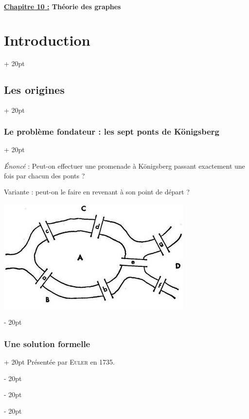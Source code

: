 \documentclass[a4paper, 12pt, twoside]{article}
\renewcommand{\emph}{\textcolor{ff4500}}
\newcommand{\ind}[1][20pt]{\advance\leftskip + #1}
\newcommand{\deind}[1][20pt]{\advance\leftskip - #1}
\newenvironment{indt}[2][20pt]{#2 \par \ind[#1]}{\par \deind} %
\newcommand{\thetitle}[2]{\begin{center}\textbf{{\LARGE \underline{\emph{#1} :}} {\Large #2}}\end{center}}
\begin{document}
    
    
    \thetitle{Chapitre 10}{Théorie des graphes}
    
    \tableofcontents
    \newpage
    
    
    \begin{indt}{\section{Introduction}}
        
        \begin{indt}{\subsection{Les origines}}
            \begin{indt}{\subsubsection{Le problème fondateur : les sept ponts de Königsberg}}
                \label{1.1.1}

                \textit{\'Enoncé} : Peut-on effectuer une promenade à Königsberg passant exactement une fois par chacun des ponts ?

                Variante : peut-on le faire en revenant à son point de départ ?

                \begin{center}
                    \includegraphics[scale=.5]{pics/pic_1.jpg}
                \end{center}
            \end{indt}

            \vspace{12pt}
            
            \begin{indt}{\subsubsection{Une solution formelle}}
                Présentée par \textsc{Euler} en 1735.


\end{indt}
\end{indt}
\end{indt}
\end{document}
